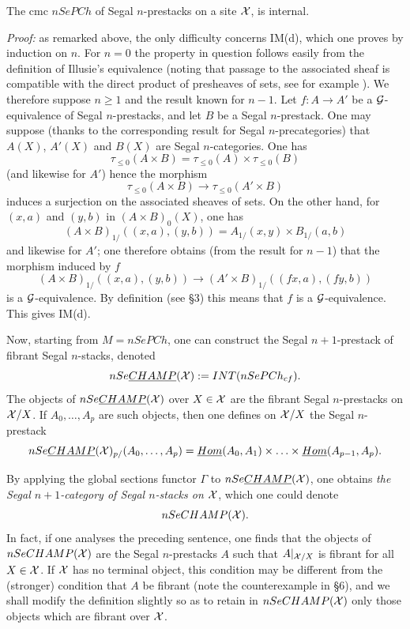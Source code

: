 \begin{lemma}
The cmc $nSePCh$ of Segal $n$-prestacks on a site ${\cal X}$, is internal.
\end{lemma}
{\em Proof:} as remarked above, the only
difficulty concerns IM(d),
which one proves by induction on $n$. For $n=0$ the property in question
follows easily from the definition of Illusie's equivalence (noting that
passage to the associated sheaf is compatible with the direct product of
presheaves of sets, see for example \cite{Rezk}). We therefore suppose
$n\geq 1$ and the result known for $n-1$. Let $f:A\rightarrow A'$ be a
${\cal G}$-equivalence of Segal $n$-prestacks, and let $B$ be a Segal $n$-prestack.
One may suppose (thanks to the corresponding result for Segal $n$-precategories)
that $A(X)$, $A'(X)$ and $B(X)$ are Segal $n$-categories. One has
$$
\tau _{\leq 0} (A\times B)= \tau _{\leq 0}(A)\times \tau _{\leq 0} (B)
$$
(and likewise for $A'$)
hence the morphism
$$
\tau _{\leq 0} (A\times B)\rightarrow \tau _{\leq 0} (A'\times B)
$$
induces a surjection on the associated sheaves of sets. On the other hand,
for $(x,a)$ and $(y,b)$ in $(A\times B)_0(X)$, one has
$$
(A\times B)_{1/}((x,a), (y,b))= A_{1/}(x,y)\times B_{1/}(a,b)
$$
and likewise for $A'$; one therefore obtains (from the result for $n-1$) that
the morphism induced by $f$
$$
(A\times B)_{1/}((x,a), (y,b))\rightarrow
(A'\times B)_{1/}((fx,a), (fy,b))
$$
is a ${\cal G}$-equivalence. By definition (see \S 3) this means that $f$ is a
${\cal G}$-equivalence. This gives IM(d).
\eop



Now,
starting from $M=nSePCh$, one can construct the Segal $n+1$-prestack of fibrant
Segal $n$-stacks, denoted
$$
nSe\underline{CHAMP}({\cal X} ):= INT(nSePCh_{cf}).
$$
The objects of $nSe\underline{CHAMP}({\cal X} )$ over $X\in {\cal X}$ are the fibrant
Segal $n$-prestacks on ${\cal X} /X$. If $A_0,\ldots , A_p$ are such objects, then
one defines on ${\cal X} /X$ the Segal $n$-prestack
$$
nSe\underline{CHAMP}({\cal X} )_{p/}(A_0,\ldots , A_p)=
\underline{Hom}(A_0,A_1)\times \ldots \times \underline{Hom}(A_{p-1}, A_p).
$$

By applying the global sections functor $\Gamma$ to
$nSe\underline{CHAMP}({\cal X} )$, one obtains {\em the Segal $n+1$-category of
Segal $n$-stacks on ${\cal X}$}, which one could denote
$$
nSeCHAMP({\cal X} ).
$$
In fact, if one analyses the preceding sentence, one finds that
the objects of $nSeCHAMP({\cal X} )$
are the Segal $n$-prestacks $A$ such that $A|_{{\cal X} /X}$ is
fibrant for all $X\in {\cal X}$. If ${\cal X}$ has no terminal object, this condition
may be different from the (stronger) condition that $A$ be fibrant
(note the counterexample in \S 6),
and we shall modify the definition slightly so as to retain in
$nSeCHAMP({\cal X} )$ only those objects which are fibrant over ${\cal X}$.

